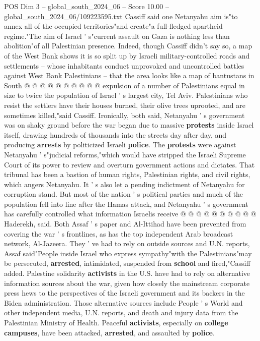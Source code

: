 \begin{textsample}{POS Dim 3 – global\_south\_2024\_06 – Score 10.00 – global\_south\_2024\_06/109223595.txt}
Cassiff said one Netanyahu aim is"to annex all of the occupied territories"and create"a full-fledged apartheid regime."The aim of Israel ' s"current assault on Gaza is nothing less than abolition"of all Palestinian presence.
Indeed, though Cassiff didn't say so, a map of the West Bank shows it is so split up by Israeli military-controlled roads and settlements -- whose inhabitants conduct unprovoked and uncontrolled battles against West Bank Palestinians -- that the area looks like a map of bantustans in South @ @ @ @ @ @ @ @ @ @ expulsion of a number of Palestinians equal in size to twice the population of Israel ' s largest city, Tel Aviv.
Palestinians who resist the settlers have their houses burned, their olive trees uprooted, and are sometimes killed,"said Cassiff.
Ironically, both said, Netanyahu ' s government was on shaky ground before the war began due to massive \textbf{protests} inside Israel itself, drawing hundreds of thousands into the streets day after day, and producing \textbf{arrests} by politicized Israeli \textbf{police}.
The \textbf{protests} were against Netanyahu ' s"judicial reforms,"which would have stripped the Israeli Supreme Court of its power to review and overturn government actions and dictates.
That tribunal has been a bastion of human rights, Palestinian rights, and civil rights, which angers Netanyahu.
It ' s also let a pending indictment of Netanyahu for corruption stand.
But most of the nation ' s political parties and much of the population fell into line after the Hamas attack, and Netanyahu ' s government has carefully controlled what information Israelis receive @ @ @ @ @ @ @ @ @ @ Haderekh, said.
Both Assaf ' s paper and Al-Ittihad have been prevented from covering the war ' s frontlines, as has the top independent Arab broadcast network, Al-Jazeera.
They ' ve had to rely on outside sources and U.N. reports, Assaf said"People inside Israel who express sympathy"with the Palestinians"may be persecuted, \textbf{arrested}, intimidated, suspended from \textbf{school} and fired,"Cassiff added.
Palestine solidarity \textbf{activists} in the U.S. have had to rely on alternative information sources about the war, given how closely the mainstream corporate press hews to the perspectives of the Israeli government and its backers in the Biden administration.
Those alternative sources include People ' s World and other independent media, U.N. reports, and death and injury data from the Palestinian Ministry of Health.
Peaceful \textbf{activists}, especially on \textbf{college} \textbf{campuses}, have been attacked, \textbf{arrested}, and assaulted by \textbf{police}.

\end{textsample}

